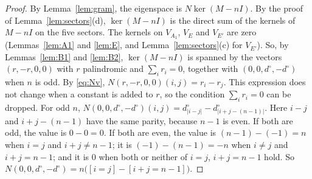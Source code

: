 \documentclass[11pt]{amsart}
\theoremstyle{plain}
\theoremstyle{definition}
\theoremstyle{remark}
\numberwithin{equation}{section}
\newcommand{\iv}[1]{[#1]}              %
\newcommand{\abs}[1]{\lvert #1\rvert}
\newcommand{\dc}{d^{\circ}}
\newcommand{\VA}{V_{A_1}}
\newcommand{\VE}{V_{E}}
\newcommand{\VEp}{V_{E'}}
\begin{document}
\begin{proof}
By Lemma~\ref{lem:gram}, the eigenspace is \(N\ker(M-nI)\). By the proof of
Lemma~\ref{lem:sectors}(d), \(\ker(M-nI)\) is the direct sum of the kernels of \(M-nI\)
on the five sectors. The kernels on \(\VA\), \(\VE\) and \(\VEp\) are zero
(Lemmas~\ref{lem:A1} and \ref{lem:E}, and Lemma~\ref{lem:sectors}(c) for \(\VEp\)). So,
by Lemmas~\ref{lem:B1} and \ref{lem:B2}, \(\ker(M-nI)\) is spanned by the vectors
\((r,-r,0,0)\) with \(r\) palindromic and \(\sum_ir_i=0\), together with
\((0,0,\dc,-\dc)\) when \(n\) is odd. By \eqref{eq:Nv}, \(N(r,-r,0,0)(i,j)=r_i-r_j\).
This expression does not change when a constant is added to \(r\), so the condition
\(\sum_ir_i=0\) can be dropped. For odd \(n\),
\(N(0,0,\dc,-\dc)(i,j)=\dc_{\abs{i-j}}-\dc_{\abs{i+j-(n-1)}}\). Here \(i-j\) and
\(i+j-(n-1)\) have the same parity, because \(n-1\) is even. If both are odd, the value
is \(0-0=0\). If both are even, the value is \((n-1)-(-1)=n\) when \(i=j\) and
\(i+j\ne n-1\); it is \((-1)-(n-1)=-n\) when \(i\ne j\) and \(i+j=n-1\); and it is \(0\)
when both or neither of \(i=j\), \(i+j=n-1\) hold. So
\(N(0,0,\dc,-\dc)=n\bigl(\iv{i=j}-\iv{i+j=n-1}\bigr)\).
\end{proof}
\end{document}
